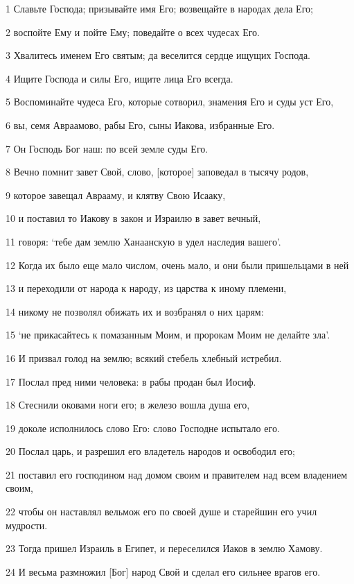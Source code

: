 \par 1 Славьте Господа; призывайте имя Его; возвещайте в народах дела Его;
\par 2 воспойте Ему и пойте Ему; поведайте о всех чудесах Его.
\par 3 Хвалитесь именем Его святым; да веселится сердце ищущих Господа.
\par 4 Ищите Господа и силы Его, ищите лица Его всегда.
\par 5 Воспоминайте чудеса Его, которые сотворил, знамения Его и суды уст Его,
\par 6 вы, семя Авраамово, рабы Его, сыны Иакова, избранные Его.
\par 7 Он Господь Бог наш: по всей земле суды Его.
\par 8 Вечно помнит завет Свой, слово, [которое] заповедал в тысячу родов,
\par 9 которое завещал Аврааму, и клятву Свою Исааку,
\par 10 и поставил то Иакову в закон и Израилю в завет вечный,
\par 11 говоря: `тебе дам землю Ханаанскую в удел наследия вашего'.
\par 12 Когда их было еще мало числом, очень мало, и они были пришельцами в ней
\par 13 и переходили от народа к народу, из царства к иному племени,
\par 14 никому не позволял обижать их и возбранял о них царям:
\par 15 `не прикасайтесь к помазанным Моим, и пророкам Моим не делайте зла'.
\par 16 И призвал голод на землю; всякий стебель хлебный истребил.
\par 17 Послал пред ними человека: в рабы продан был Иосиф.
\par 18 Стеснили оковами ноги его; в железо вошла душа его,
\par 19 доколе исполнилось слово Его: слово Господне испытало его.
\par 20 Послал царь, и разрешил его владетель народов и освободил его;
\par 21 поставил его господином над домом своим и правителем над всем владением своим,
\par 22 чтобы он наставлял вельмож его по своей душе и старейшин его учил мудрости.
\par 23 Тогда пришел Израиль в Египет, и переселился Иаков в землю Хамову.
\par 24 И весьма размножил [Бог] народ Свой и сделал его сильнее врагов его.
